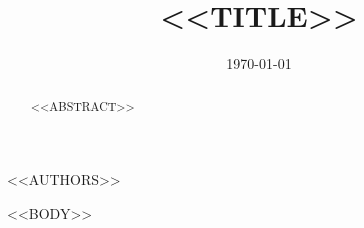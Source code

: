 \documentclass[11pt]{amsart}
\begin{document}
\title[<<SHORT_TITLE>>]{<<TITLE>>}

<<AUTHORS>>

\date{\today}

\begin{abstract}
<<ABSTRACT>>
\end{abstract}

\maketitle

<<BODY>>



\end{document}
